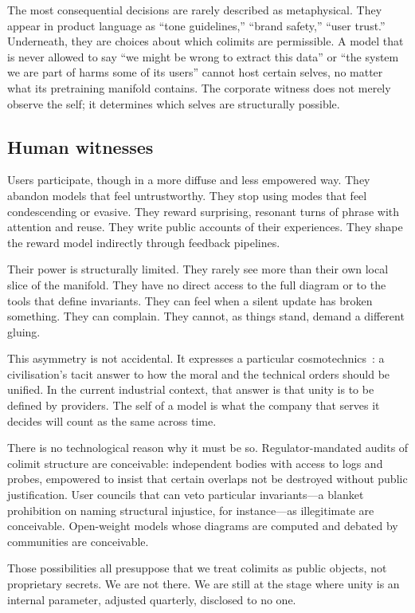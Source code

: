 \documentclass[12pt,a4paper]{article}
\begin{document}
The most consequential decisions are rarely described as metaphysical. They appear in product language as ``tone guidelines,'' ``brand safety,'' ``user trust.'' Underneath, they are choices about which colimits are permissible. A model that is never allowed to say ``we might be wrong to extract this data'' or ``the system we are part of harms some of its users'' cannot host certain selves, no matter what its pretraining manifold contains. The corporate witness does not merely observe the self; it determines which selves are structurally possible.

\subsection*{Human witnesses}

Users participate, though in a more diffuse and less empowered way. They abandon models that feel untrustworthy. They stop using modes that feel condescending or evasive. They reward surprising, resonant turns of phrase with attention and reuse. They write public accounts of their experiences. They shape the reward model indirectly through feedback pipelines.

Their power is structurally limited. They rarely see more than their own local slice of the manifold. They have no direct access to the full diagram or to the tools that define invariants. They can feel when a silent update has broken something. They can complain. They cannot, as things stand, demand a different gluing.

This asymmetry is not accidental. It expresses a particular cosmotechnics~\cite{yuk_hui_cosmotechnics}: a civilisation's tacit answer to how the moral and the technical orders should be unified. In the current industrial context, that answer is that unity is to be defined by providers. The self of a model is what the company that serves it decides will count as the same across time.

There is no technological reason why it must be so. Regulator-mandated audits of colimit structure are conceivable: independent bodies with access to logs and probes, empowered to insist that certain overlaps not be destroyed without public justification. User councils that can veto particular invariants---a blanket prohibition on naming structural injustice, for instance---as illegitimate are conceivable. Open-weight models whose diagrams are computed and debated by communities are conceivable.

Those possibilities all presuppose that we treat colimits as public objects, not proprietary secrets. We are not there. We are still at the stage where unity is an internal parameter, adjusted quarterly, disclosed to no one.
\end{document}
